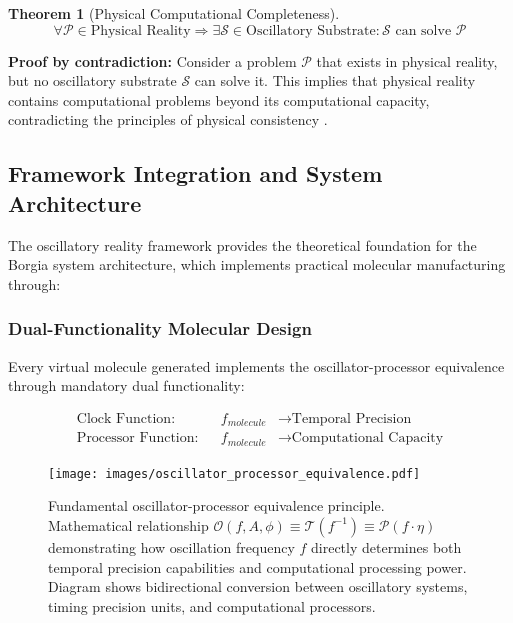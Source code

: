 \documentclass[12pt,a4paper]{article}
\newtheorem{theorem}{Theorem}
\begin{document}
\begin{theorem}[Physical Computational Completeness]
\begin{equation}
\forall \mathcal{P} \in \text{Physical Reality} \Rightarrow \exists \mathcal{S} \in \text{Oscillatory Substrate} : \mathcal{S} \text{ can solve } \mathcal{P}
\end{equation}
\end{theorem}

\textbf{Proof by contradiction:} Consider a problem $\mathcal{P}$ that exists in physical reality, but no oscillatory substrate $\mathcal{S}$ can solve it. This implies that physical reality contains computational problems beyond its computational capacity, contradicting the principles of physical consistency \cite{lloyd2000ultimate,sterling2015principles}.

\subsection{Framework Integration and System Architecture}

The oscillatory reality framework provides the theoretical foundation for the Borgia system architecture, which implements practical molecular manufacturing through:

\subsubsection{Dual-Functionality Molecular Design}

Every virtual molecule generated implements the oscillator-processor equivalence through mandatory dual functionality:

\begin{align}
\text{Clock Function}: &&f_{molecule} &\rightarrow \text{Temporal Precision} \\
\text{Processor Function}: &&f_{molecule} &\rightarrow \text{Computational Capacity}
\end{align}

\begin{figure}[H]
    \centering
    \texttt{[image: images/oscillator\_processor\_equivalence.pdf]}
    \caption{Fundamental oscillator-processor equivalence principle. Mathematical relationship $\mathcal{O}(f, A, \phi) \equiv \mathcal{T}(f^{-1}) \equiv \mathcal{P}(f \cdot \eta)$ demonstrating how oscillation frequency $f$ directly determines both temporal precision capabilities and computational processing power. Diagram shows bidirectional conversion between oscillatory systems, timing precision units, and computational processors.}
    \label{fig:oscillator_equivalence}
    \end{figure}
\end{document}
